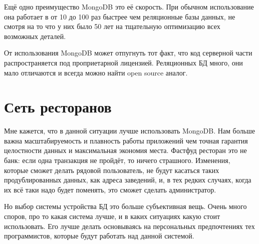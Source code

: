 \documentclass[12pt]{article}
\begin{document}
  Ещё одно преимущество MongoDB это её скорость.
  При обычном использование она работает в от 10 до 100 раз быстрее чем реляционные базы данных,
  не смотря на то что у них было 50 лет на тщательную оптимизацию всех возможных деталей.

  От использования MongoDB может отпугнуть тот факт, что код серверной части распространяется под проприетарной лицензией.
  Реляционных БД много, они мало отличаются и всегда можно найти open source аналог.

  \section{Сеть ресторанов}
  Мне кажется, что в данной ситуации лучше использовать MongoDB.
  Нам больше важна масштабируемость и плавность работы приложений чем точная гарантия целостности данных и максимальная экономия места.
  Фастфуд ресторан это не банк: если одна транзакция не пройдёт, то ничего страшного.
  Изменения, которые сможет делать рядовой пользователь, не будут касаться таких продублированных данных, как адреса заведений,
  и, в тех редких случаях, когда их всё таки надо будет поменять, это сможет сделать администратор.

  Но выбор системы устройства БД это больше субъективная вещь.
  Очень много споров, про то какая система лучше, и в каких ситуациях какую стоит использовать.
  Его лучше делать основываясь на персональных предпочтениях тех программистов, которые будут работать над данной системой.
\end{document}
